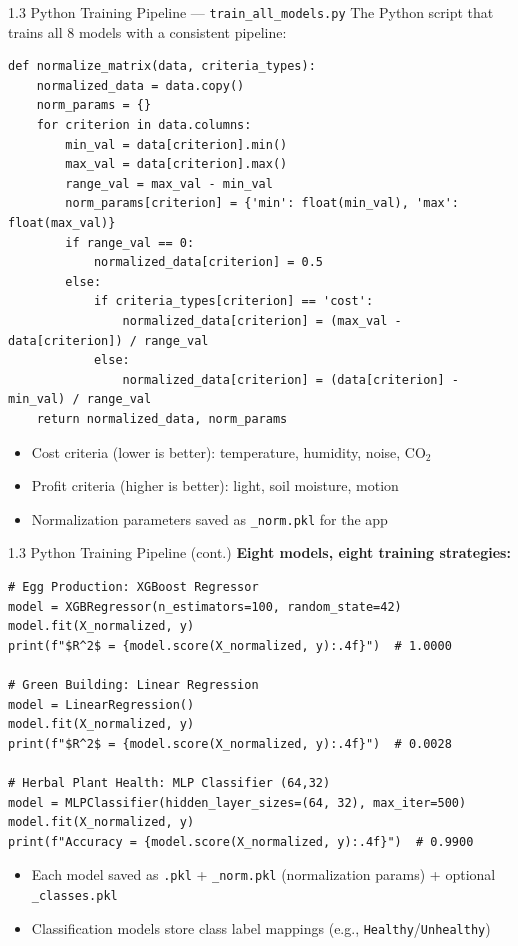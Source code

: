 \documentclass[aspectratio=169]{beamer}
\begin{document}
\begin{frame}{1.3 Python Training Pipeline --- \texttt{train\_all\_models.py}}
  The Python script that trains all 8 models with a consistent pipeline:

  \begin{lstlisting}[style=pythonstyle]
def normalize_matrix(data, criteria_types):
    normalized_data = data.copy()
    norm_params = {}
    for criterion in data.columns:
        min_val = data[criterion].min()
        max_val = data[criterion].max()
        range_val = max_val - min_val
        norm_params[criterion] = {'min': float(min_val), 'max': float(max_val)}
        if range_val == 0:
            normalized_data[criterion] = 0.5
        else:
            if criteria_types[criterion] == 'cost':
                normalized_data[criterion] = (max_val - data[criterion]) / range_val
            else:
                normalized_data[criterion] = (data[criterion] - min_val) / range_val
    return normalized_data, norm_params
  \end{lstlisting}

  \begin{itemize}
    \item \alert{Cost criteria} (lower is better): temperature, humidity, noise, CO$_2$
    \item \alert{Profit criteria} (higher is better): light, soil moisture, motion
    \item Normalization parameters saved as \texttt{\_norm.pkl} for the app
  \end{itemize}
\end{frame}

\begin{frame}{1.3 Python Training Pipeline (cont.)}
  \textbf{Eight models, eight training strategies:}

  \vspace{0.2cm}
  \begin{lstlisting}[style=pythonstyle]
# Egg Production: XGBoost Regressor
model = XGBRegressor(n_estimators=100, random_state=42)
model.fit(X_normalized, y)
print(f"$R^2$ = {model.score(X_normalized, y):.4f}")  # 1.0000

# Green Building: Linear Regression
model = LinearRegression()
model.fit(X_normalized, y)
print(f"$R^2$ = {model.score(X_normalized, y):.4f}")  # 0.0028

# Herbal Plant Health: MLP Classifier (64,32)
model = MLPClassifier(hidden_layer_sizes=(64, 32), max_iter=500)
model.fit(X_normalized, y)
print(f"Accuracy = {model.score(X_normalized, y):.4f}")  # 0.9900
  \end{lstlisting}

  \begin{itemize}
    \item Each model saved as \texttt{.pkl} + \texttt{\_norm.pkl} (normalization params) + optional \texttt{\_classes.pkl}
    \item Classification models store class label mappings (e.g., \texttt{Healthy}/\texttt{Unhealthy})
  \end{itemize}
\end{frame}
\end{document}
